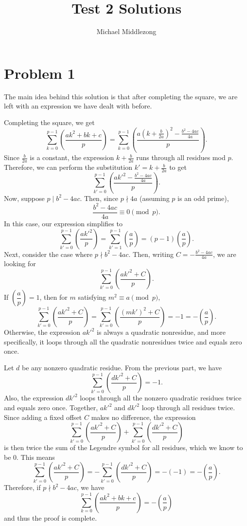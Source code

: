 \documentclass{scrartcl}
\title{Test 2 Solutions}
\author{Michael Middlezong}
\begin{document}
\maketitle

\section*{Problem 1}
The main idea behind this solution is that after completing the square, we are left with an expression we have dealt with before.

Completing the square, we get
\[ \sum_{k=0}^{p-1} \left(\dfrac{ak^2 + bk + c}{p}\right) = \sum_{k=0}^{p-1} \left(\dfrac{a(k+\frac{b}{2a})^2 - \frac{b^2 - 4ac}{4a}}{p}\right). \]
Since $\frac{b}{2a}$ is a constant, the expression $k + \frac{b}{2a}$ runs through all residues mod $p$.
Therefore, we can perform the substitution $k' = k + \frac{b}{2a}$ to get
\[ \sum_{k'=0}^{p-1} \left(\dfrac{ak'^2 - \frac{b^2 - 4ac}{4a}}{p}\right). \]
Now, suppose $p \mid b^2 - 4ac$. Then, since $p \nmid 4a$ (assuming $p$ is an odd prime),
\[ \frac{b^2 - 4ac}{4a} \equiv 0 \pmod{p}. \]
In this case, our expression simplifies to
\[ \sum_{k'=0}^{p-1} \left(\dfrac{ak'^2}{p}\right) = \sum_{k'=1}^{p-1} \left(\dfrac{a}{p}\right) = (p-1)\left(\dfrac{a}{p}\right). \]
Next, consider the case where $p \nmid b^2 - 4ac$. Then, writing $C = -\frac{b^2 - 4ac}{4a}$, we are looking for
\[ \sum_{k'=0}^{p-1} \left(\dfrac{ak'^2 + C}{p}\right). \]
If $\left(\dfrac{a}{p}\right) = 1$, then for $m$ satisfying $m^2 \equiv a \pmod{p}$,
\[ \sum_{k'=0}^{p-1} \left(\dfrac{ak'^2 + C}{p}\right) = \sum_{k'=0}^{p-1} \left(\dfrac{(mk')^2 + C}{p}\right) = -1 = -\left(\dfrac{a}{p}\right). \]
Otherwise, the expression $ak'^2$ is always a quadratic nonresidue, and more specifically, it loops through all the quadratic nonresidues twice and equals zero once.

Let $d$ be any nonzero quadratic residue.
From the previous part, we have
\[ \sum_{k'=0}^{p-1} \left(\dfrac{dk'^2 + C}{p}\right) = -1. \]
Also, the expression $dk'^2$ loops through all the nonzero quadratic residues twice and equals zero once.
Together, $ak'^2$ and $dk'^2$ loop through all residues twice.
Since adding a fixed offset $C$ makes no difference, the expression
\[ \sum_{k'=0}^{p-1} \left(\dfrac{ak'^2 + C}{p}\right) + \sum_{k'=0}^{p-1} \left(\dfrac{dk'^2 + C}{p}\right) \]
is then twice the sum of the Legendre symbol for all residues, which we know to be $0$.
This means
\[ \sum_{k'=0}^{p-1} \left(\dfrac{ak'^2 + C}{p}\right) = -\sum_{k'=0}^{p-1} \left(\dfrac{dk'^2 + C}{p}\right) = -(-1) = -\left(\dfrac{a}{p}\right). \]
Therefore, if $p \nmid b^2 - 4ac$, we have
\[ \sum_{k=0}^{p-1} \left(\dfrac{ak^2 + bk + c}{p}\right) = -\left(\dfrac{a}{p}\right) \]
and thus the proof is complete.
\pagebreak
\end{document}
